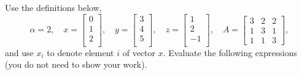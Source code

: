 \documentclass{article}
\def\blu#1{{\color{blu}#1}}
\begin{document}
Use the definitions below,
\[
\alpha = 2,\quad
x = \left[\begin{array}{c}
0\\
1\\
2\\
\end{array}\right], \quad
y = \left[\begin{array}{c}
3\\
4\\
5\\
\end{array}\right],\quad
z = \left[\begin{array}{c}
1\\
2\\
-1\\
\end{array}\right],\quad
A = \left[\begin{array}{ccc}
3 & 2 & 2\\
1 & 3 & 1\\
1 & 1 & 3
\end{array}\right],
\]
and use $x_i$ to denote element $i$ of vector $x$.
\blu{Evaluate the following expressions} (you do not need to show your work).
\end{document}
